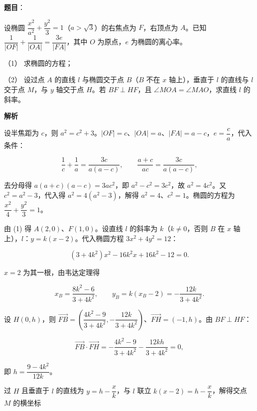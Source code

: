 \begin{answer}

\textbf{题目}：

设椭圆 \(\dfrac{x^{2}}{a^{2}}+\dfrac{y^{2}}{3}=1\)（\(a>\sqrt{3}\)）的右焦点为 \(F\)，右顶点为 \(A\)。已知 \(\dfrac{1}{|OF|}+\dfrac{1}{|OA|}=\dfrac{3e}{|FA|}\)，其中 \(O\) 为原点，\(e\) 为椭圆的离心率。

（1） 求椭圆的方程；

（2） 设过点 \(A\) 的直线 \(l\) 与椭圆交于点 \(B\)（\(B\) 不在 \(x\) 轴上），垂直于 \(l\) 的直线与 \(l\) 交于点 \(M\)，与 \(y\) 轴交于点 \(H\)。若 \(BF\perp HF\)，且 \(\angle MOA=\angle MAO\)，求直线 \(l\) 的斜率。

\textbf{解析}


设半焦距为 \(c\)，则 \(a^{2}=c^{2}+3\)。\(|OF|=c\)、\(|OA|=a\)、\(|FA|=a-c\)，\(e=\dfrac{c}{a}\)，代入条件：

\nopagebreak[4]
\[
\dfrac{1}{c}+\dfrac{1}{a}=\dfrac{3c}{a(a-c)},\qquad \dfrac{a+c}{ac}=\dfrac{3c}{a(a-c)},
\]

去分母得 \(a(a+c)(a-c)=3ac^{2}\)，即 \(a^{2}-c^{2}=3c^{2}\)，故 \(a^{2}=4c^{2}\)。又 \(c^{2}=a^{2}-3\)，代入得 \(a^{2}=4(a^{2}-3)\)，解得 \(a^{2}=4\)、\(c^{2}=1\)。椭圆的方程为 \(\dfrac{x^{2}}{4}+\dfrac{y^{2}}{3}=1\)。


由 (1) 得 \(A(2,0)\)、\(F(1,0)\)。设直线 \(l\) 的斜率为 \(k\)（\(k\neq 0\)，否则 \(B\) 在 \(x\) 轴上），\(l\)：\(y=k(x-2)\)。代入椭圆方程 \(3x^{2}+4y^{2}=12\)：

\nopagebreak[4]
\[
(3+4k^{2})x^{2}-16k^{2}x+16k^{2}-12=0.
\]

\(x=2\) 为其一根，由韦达定理得

\nopagebreak[4]
\[
x_{B}=\dfrac{8k^{2}-6}{3+4k^{2}},\qquad y_{B}=k(x_{B}-2)=-\dfrac{12k}{3+4k^{2}}.
\]

设 \(H(0,h)\)，则 \(\overrightarrow{FB}=\left(\dfrac{4k^{2}-9}{3+4k^{2}},-\dfrac{12k}{3+4k^{2}}\right)\)、\(\overrightarrow{FH}=(-1,h)\)。由 \(BF\perp HF\)：

\nopagebreak[4]
\[
\overrightarrow{FB}\cdot\overrightarrow{FH}=-\dfrac{4k^{2}-9}{3+4k^{2}}-\dfrac{12kh}{3+4k^{2}}=0,
\]

即 \(h=\dfrac{9-4k^{2}}{12k}\)。

过 \(H\) 且垂直于 \(l\) 的直线为 \(y=h-\dfrac{x}{k}\)，与 \(l\) 联立 \(k(x-2)=h-\dfrac{x}{k}\)，解得交点 \(M\) 的横坐标


\end{answer}
